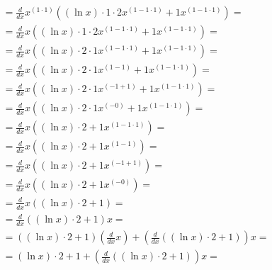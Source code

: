 \documentclass{article}
\begin{document}
\begin{gather*}
={{\frac{{d}}{{d{{x}}}}}{{{{x}^{\left({1}{\cdot}{1}\right)}}{\left({{{\left(\ln{{x}}\right)}{\cdot}{{1}{\cdot}{2}}}{{x}^{\left({1}-{{1}{\cdot}{1}}\right)}}}+{{1}{{x}^{\left({1}-{{1}{\cdot}{1}}\right)}}}\right)}}}}=\\
={{\frac{{d}}{{d{{x}}}}}{{{x}{\left({{{\left(\ln{{x}}\right)}{\cdot}{{1}{\cdot}{2}}}{{x}^{\left({1}-{{1}{\cdot}{1}}\right)}}}+{{1}{{x}^{\left({1}-{{1}{\cdot}{1}}\right)}}}\right)}}}}=\\
={{\frac{{d}}{{d{{x}}}}}{{{x}{\left({{\left(\ln{{x}}\right)}{\cdot}{{2}{\cdot}{{1}{{x}^{\left({1}-{{1}{\cdot}{1}}\right)}}}}}+{{1}{{x}^{\left({1}-{{1}{\cdot}{1}}\right)}}}\right)}}}}=\\
={{\frac{{d}}{{d{{x}}}}}{{{x}{\left({{\left(\ln{{x}}\right)}{\cdot}{{2}{\cdot}{{1}{{x}^{\left({1}-{1}\right)}}}}}+{{1}{{x}^{\left({1}-{{1}{\cdot}{1}}\right)}}}\right)}}}}=\\
={{\frac{{d}}{{d{{x}}}}}{{{x}{\left({{\left(\ln{{x}}\right)}{\cdot}{{2}{\cdot}{{1}{{x}^{\left({-{1}}+{1}\right)}}}}}+{{1}{{x}^{\left({1}-{{1}{\cdot}{1}}\right)}}}\right)}}}}=\\
={{\frac{{d}}{{d{{x}}}}}{{{x}{\left({{\left(\ln{{x}}\right)}{\cdot}{{2}{\cdot}{{1}{{x}^{\left(-{0}\right)}}}}}+{{1}{{x}^{\left({1}-{{1}{\cdot}{1}}\right)}}}\right)}}}}=\\
={{\frac{{d}}{{d{{x}}}}}{{{x}{\left({{\left(\ln{{x}}\right)}{\cdot}{2}}+{{1}{{x}^{\left({1}-{{1}{\cdot}{1}}\right)}}}\right)}}}}=\\
={{\frac{{d}}{{d{{x}}}}}{{{x}{\left({{\left(\ln{{x}}\right)}{\cdot}{2}}+{{1}{{x}^{\left({1}-{1}\right)}}}\right)}}}}=\\
={{\frac{{d}}{{d{{x}}}}}{{{x}{\left({{\left(\ln{{x}}\right)}{\cdot}{2}}+{{1}{{x}^{\left({-{1}}+{1}\right)}}}\right)}}}}=\\
={{\frac{{d}}{{d{{x}}}}}{{{x}{\left({{\left(\ln{{x}}\right)}{\cdot}{2}}+{{1}{{x}^{\left(-{0}\right)}}}\right)}}}}=\\
={{\frac{{d}}{{d{{x}}}}}{{{x}{\left({{\left(\ln{{x}}\right)}{\cdot}{2}}+{1}\right)}}}}=\\
={{\frac{{d}}{{d{{x}}}}}{{{\left({{\left(\ln{{x}}\right)}{\cdot}{2}}+{1}\right)}{x}}}}=\\
={{{\left({{\left(\ln{{x}}\right)}{\cdot}{2}}+{1}\right)}{\left({\frac{{d}}{{d{{x}}}}}{{x}}\right)}}+{{\left({\frac{{d}}{{d{{x}}}}}{{\left({{\left(\ln{{x}}\right)}{\cdot}{2}}+{1}\right)}}\right)}{x}}}=\\
={{{\left(\ln{{x}}\right)}{\cdot}{2}}+{{1}+{{\left({\frac{{d}}{{d{{x}}}}}{{\left({{\left(\ln{{x}}\right)}{\cdot}{2}}+{1}\right)}}\right)}{x}}}}=\\

\end{gather*}
\end{document}

